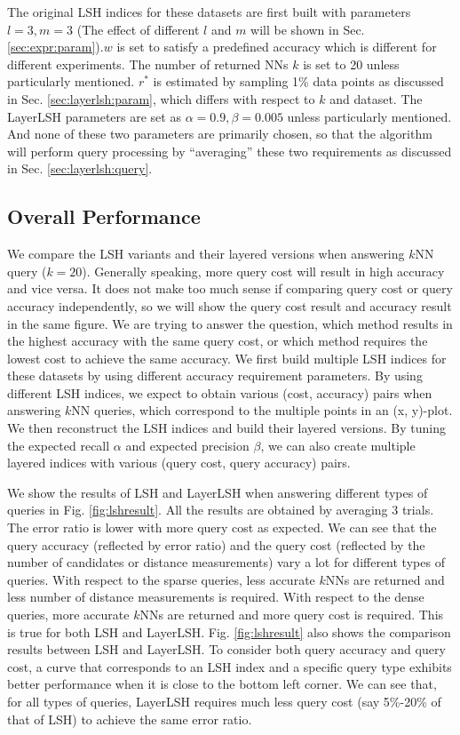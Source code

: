  The original LSH indices for these datasets are first built with parameters $l=3,m=3$ (The effect of different $l$ and $m$ will be shown in Sec. \ref{sec:expr:param}).$w$ is set to satisfy a predefined accuracy which is different for different experiments. The number of returned NNs $k$ is set to 20 unless particularly mentioned. $r^*$ is estimated by sampling 1\% data points as discussed in Sec. \ref{sec:layerlsh:param}, which differs with respect to $k$ and dataset. The LayerLSH parameters are set as $\alpha=0.9, \beta=0.005$ unless particularly mentioned. And none of these two parameters are primarily chosen, so that the algorithm will perform query processing by ``averaging'' these two requirements as discussed in Sec. \ref{sec:layerlsh:query}.

\subsection{Overall Performance}
\label{sec:expr:overall}

We compare the LSH variants and their layered versions when answering $k$NN query ($k=20$). Generally speaking, more query cost will result in high accuracy and vice versa. It does not make too much sense if comparing query cost or query accuracy independently, so we will show the query cost result and accuracy result in the same figure. We are trying to answer the question, which method results in the highest accuracy with the same query cost, or which method requires the lowest cost to achieve the same accuracy. We first build multiple LSH indices for these datasets by using different accuracy requirement parameters. By using different LSH indices, we expect to obtain various (cost, accuracy) pairs when answering $k$NN queries, which correspond to the multiple points in an (x, y)-plot. We then reconstruct the LSH indices and build their layered versions. By tuning the expected recall $\alpha$ and expected precision $\beta$, we can also create multiple layered indices with various (query cost, query accuracy) pairs.

 We show the results of LSH and LayerLSH when answering different types of queries in Fig. \ref{fig:lshresult}. All the results are obtained by averaging 3 trials. The error ratio is lower with more query cost as expected. We can see that the query accuracy (reflected by error ratio) and the query cost (reflected by the number of candidates or distance measurements) vary a lot for different types of queries. With respect to the sparse queries, less accurate $k$NNs are returned and less number of distance measurements is required. With respect to the dense queries, more accurate $k$NNs are returned and more query cost is required. This is true for both LSH and LayerLSH. Fig. \ref{fig:lshresult} also shows the comparison results between LSH and LayerLSH. To consider both query accuracy and query cost, a curve that corresponds to an LSH index and a specific query type exhibits better performance when it is close to the bottom left corner. We can see that, for all types of queries, LayerLSH requires much less query cost (say 5\%-20\% of that of LSH) to achieve the same error ratio.

